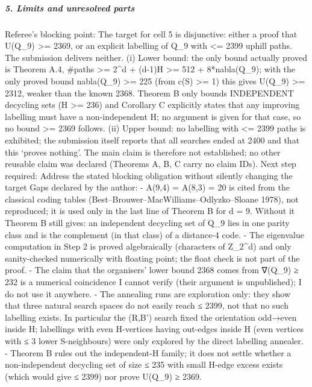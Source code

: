 \documentclass[11pt,a4paper]{article}
\begin{document}
\subparagraph{5. Limits and unresolved
parts}\label{limits-and-unresolved-parts}

Referee's blocking point: The target for cell 5 is disjunctive: either a
proof that U(Q\_9) \textgreater= 2369, or an explicit labelling of Q\_9
with \textless= 2399 uphill paths. The submission delivers neither. (i)
Lower bound: the only bound actually proved is Theorem A.4, \#paths
\textgreater= 2\^{}d + (d-1)\textbar H\textbar{} \textgreater= 512 +
8*nabla(Q\_9); with the only proved bound nabla(Q\_9) \textgreater= 225
(from c(S) \textgreater= 1) this gives U(Q\_9) \textgreater= 2312,
weaker than the known 2368. Theorem B only bounds INDEPENDENT decycling
sets (\textbar H\textbar{} \textgreater= 236) and Corollary C explicitly
states that any improving labelling must have a non-independent H; no
argument is given for that case, so no bound \textgreater= 2369 follows.
(ii) Upper bound: no labelling with \textless= 2399 paths is exhibited;
the submission itself reports that all searches ended at 2400 and that
this `proves nothing'. The main claim is therefore not established; no
other reusable claim was declared (Theorems A, B, C carry no claim IDs).
Next step required: Address the stated blocking obligation without
silently changing the target Gaps declared by the author: - A(9,4) =
A(8,3) = 20 is cited from the classical coding tables
(Best--Brouwer--MacWilliams--Odlyzko--Sloane 1978), not reproduced; it
is used only in the last line of Theorem B for d = 9. Without it Theorem
B still gives: an independent decycling set of Q\_9 lies in one parity
class and is the complement (in that class) of a distance-4 code. - The
eigenvalue computation in Step 2 is proved algebraically (characters of
Z\_2\^{}d) and only sanity-checked numerically with floating point; the
float check is not part of the proof. - The claim that the organisers'
lower bound 2368 comes from ∇(Q\_9) ≥ 232 is a numerical coincidence I
cannot verify (their argument is unpublished); I do not use it anywhere.
- The annealing runs are exploration only: they show that three natural
search spaces do not easily reach ≤ 2399, not that no such labelling
exists. In particular the (R,B') search fixed the orientation odd→even
inside H; labellings with even H-vertices having out-edges inside H
(even vertices with ≤ 3 lower S-neighbours) were only explored by the
direct labelling annealer. - Theorem B rules out the independent-H
family; it does not settle whether a non-independent decycling set of
size ≤ 235 with small H-edge excess exists (which would give ≤ 2399) nor
prove U(Q\_9) ≥ 2369.
\end{document}
